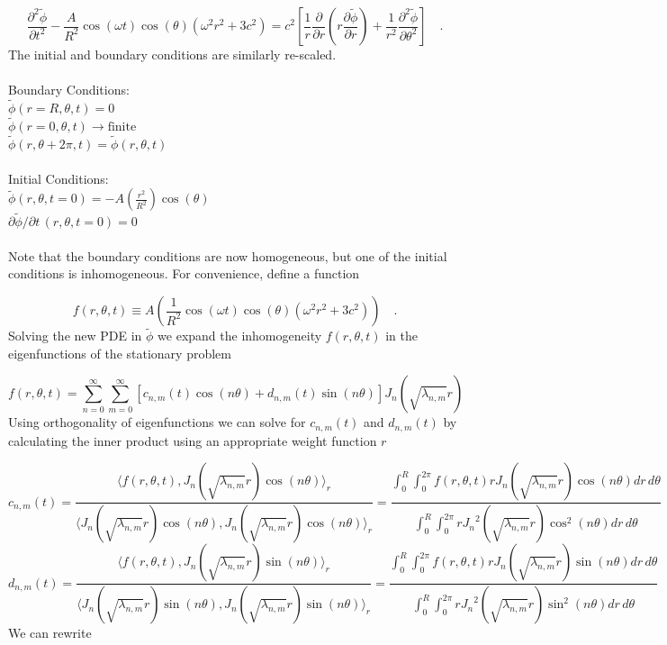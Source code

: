 \documentclass{homework}
\begin{document}
\[ \frac{ \partial^2 \tilde{\phi}}{\partial t^2} - \frac{A}{R^2} \cos(\omega t) \cos(\theta) (\omega^2 r^2 + 3c^2) = c^2 \left[ \frac{1}{r} \frac{\partial}{\partial r} (r \frac{\partial \tilde{\phi}}{\partial r}) + \frac{1}{r^2} \frac{\partial^2 \tilde{\phi} }{\partial \theta^2} \right] \quad .\]
\newpage
\noindent
The initial and boundary conditions are similarly re-scaled.
\\ \\
\noindent Boundary Conditions: \\
$ \tilde{\phi}(r=R, \theta, t) = 0 $ \\
$ \tilde{\phi}(r=0, \theta, t) \rightarrow \textrm{finite} $ \\
$ \tilde{\phi}(r, \theta + 2\pi, t) = \tilde{\phi}(r, \theta, t) $ \\ \\
\noindent Initial Conditions: \\
$ \tilde{\phi}(r, \theta, t=0) = - A \left( \frac{r^2}{R^2} \right) \cos(\theta) $ \\
$ \partial \tilde{\phi}/ \partial t \, (r, \theta, t=0) = 0 $ \\ \\ \noindent
Note that the boundary conditions are now homogeneous, but one of the initial conditions is inhomogeneous. For convenience, define a function

\[ f(r, \theta , t) \equiv A \left( \frac{1}{R^2} \cos(\omega t) \cos(\theta) (\omega^2 r^2 + 3c^2) \right) \quad .\]
\noindent
Solving the new PDE in $\tilde{\phi}$ we expand the inhomogeneity $f(r, \theta , t)$ in the eigenfunctions of the stationary problem

\[ f(r, \theta , t) = \sum^\infty_{n=0} \sum^\infty_{m=0} [c_{n,m}(t) \cos(n \theta) + d_{n,m}(t) \sin(n \theta) ] J_n (\sqrt{\lambda_{n,m}} r) \]
\noindent
Using orthogonality of eigenfunctions we can solve for $c_{n,m}(t)$ and $d_{n,m}(t)$ by calculating the inner product using an appropriate weight function $r$

\[ c_{n,m}(t) = \frac{\langle f(r, \theta, t), J_n (\sqrt{\lambda_{n,m}} r) \cos(n \theta) \rangle_r}{\langle J_n (\sqrt{\lambda_{n,m}} r) \cos(n \theta), J_n (\sqrt{\lambda_{n,m}} r) \cos(n \theta) \rangle_r} = \frac{\int^R_0 \int^{2 \pi}_0 f(r, \theta , t) r J_n (\sqrt{\lambda_{n,m}} r) \cos(n \theta) dr \, d \theta}{\int^R_0 \int^{2 \pi}_0 r {J_n}^2 (\sqrt{\lambda_{n,m}} r) \cos^2(n \theta) dr \, d \theta} \]
\[ d_{n,m}(t) = \frac{\langle f(r, \theta, t), J_n (\sqrt{\lambda_{n,m}} r) \sin(n \theta) \rangle_r}{\langle J_n (\sqrt{\lambda_{n,m}} r) \sin(n \theta), J_n (\sqrt{\lambda_{n,m}} r) \sin(n \theta) \rangle_r} = \frac{\int^R_0 \int^{2 \pi}_0 f(r, \theta , t) r J_n (\sqrt{\lambda_{n,m}} r) \sin(n \theta) dr \, d \theta}{\int^R_0 \int^{2 \pi}_0 r {J_n}^2 (\sqrt{\lambda_{n,m}} r) \sin^2(n \theta) dr \, d \theta} \]
\noindent
We can rewrite 
\end{document}
